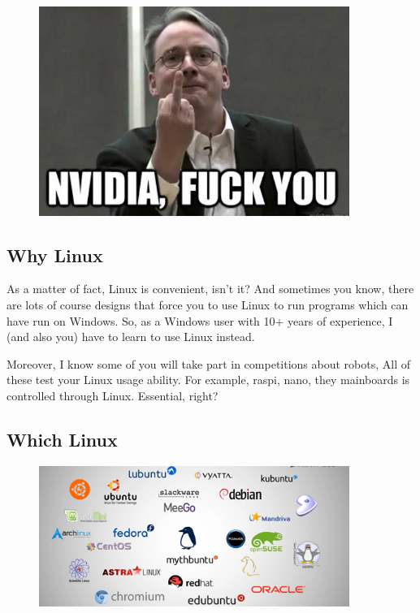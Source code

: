 \documentclass[12pt]{ctexart}
\begin{document}
\begin{figure}[H]
    \centering
    \includegraphics[width=0.9\textwidth,keepaspectratio]{assets/Linux/Hello Linux!/2.png}
\end{figure}

\subsection*{\textbf{Why Linux}}

As a matter of fact, Linux is convenient, isn't it? And
sometimes you know, there are lots of course designs that force you to
use Linux to run programs which can have run on Windows. So, as a
Windows user with 10+ years of experience, I (and also you) have to
learn to use Linux instead.

Moreover, I know some of you will take part in competitions about
robots, All of these test your Linux usage ability. For example, raspi,
nano, they mainboards is controlled through Linux. Essential, right?

\subsection*{\textbf{Which Linux}}

\begin{figure}[H]
    \centering
    \includegraphics[width=0.9\textwidth,keepaspectratio]{assets/Linux/Hello Linux!/3.png}
\end{figure}
\end{document}

